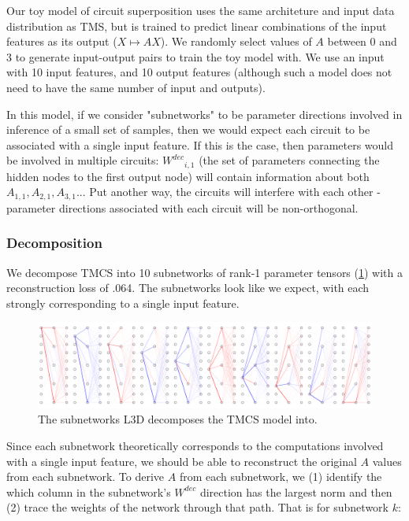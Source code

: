 \documentclass{article}
\theoremstyle{plain}
\theoremstyle{definition}
\theoremstyle{remark}
\begin{document}
Our toy model of circuit superposition uses the same architeture and input data distribution as TMS, but is trained to predict linear combinations of the input features as its output ($X \mapsto A X$). We randomly select values of $A$ between 0 and 3 to generate input-output pairs to train the toy model with. We use an input with 10 input features, and 10 output features (although such a model does not need to have the same number of input and outputs).

In this model, if we consider "subnetworks" to be parameter directions involved in inference of a small set of samples, then we would expect each circuit to be associated with a single input feature. If this is the case, then parameters would be involved in multiple circuits: ${W^{dec}}_{i,1}$ (the set of parameters connecting the hidden nodes to the first output node) will contain information about both $A_{1,1}, A_{2,1}, A_{3,1}...$  Put another way, the circuits will interfere with each other - parameter directions associated with each circuit will be non-orthogonal. 

\subsubsection{Decomposition}

We decompose TMCS into 10 subnetworks of rank-1 parameter tensors (\ref{fig:5_circuit_superposition_decomposition}) with a reconstruction loss of .064. The subnetworks look like we expect, with each strongly corresponding to a single input feature.


\begin{figure}[htbp]
    \centerline{\includegraphics[width=\textwidth]{../figures/5_circuit_superposition_decomposition.pdf}}
    \centering
    \caption{The subnetworks L3D decomposes the TMCS model into.}\label{fig:5_circuit_superposition_decomposition}
\end{figure}


Since each subnetwork theoretically corresponds to the computations involved with a single input feature, we should be able to reconstruct the original $A$ values from each subnetwork. To derive $A$ from each subnetwork, we (1) identify the which column in the subnetwork's $W^{dec}$ direction has the largest norm and then (2) trace the weights of the network through that path. That is for subnetwork $k$: 
\end{document}
